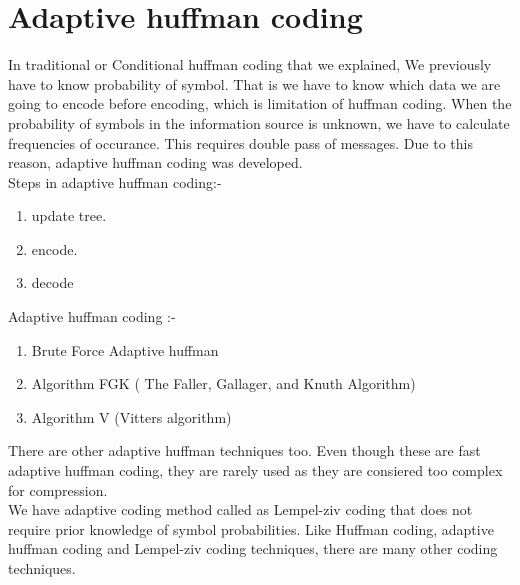 \documentclass[10pt,a4paper]{article}
\begin{document}
\section{Adaptive huffman coding}
In traditional or Conditional huffman coding that we explained, We previously have to know probability of symbol. That is we have to know which data we are going to encode before encoding, which is limitation of huffman coding. When the probability of symbols in
the information source is unknown, we have to calculate frequencies of occurance. This requires double pass of messages. Due to this reason, adaptive huffman coding was developed. \\
Steps in adaptive huffman coding:- \\
  
\begin{enumerate}
	\item  update tree.  
	\item encode.  
	\item decode
\end{enumerate}
Adaptive huffman coding :-
\begin{enumerate}
	\item Brute Force Adaptive huffman 
	\item Algorithm FGK ( The Faller, Gallager, and Knuth Algorithm)
	\item Algorithm V (Vitters algorithm)
\end{enumerate}
There are other adaptive huffman techniques too. Even though these are fast adaptive huffman coding, they are rarely used as they are consiered too complex for compression. \\
We have adaptive coding method called as Lempel-ziv coding that does not require prior knowledge of symbol probabilities. Like Huffman coding, adaptive huffman coding and Lempel-ziv coding techniques, there are many other coding techniques. 
\end{document}
